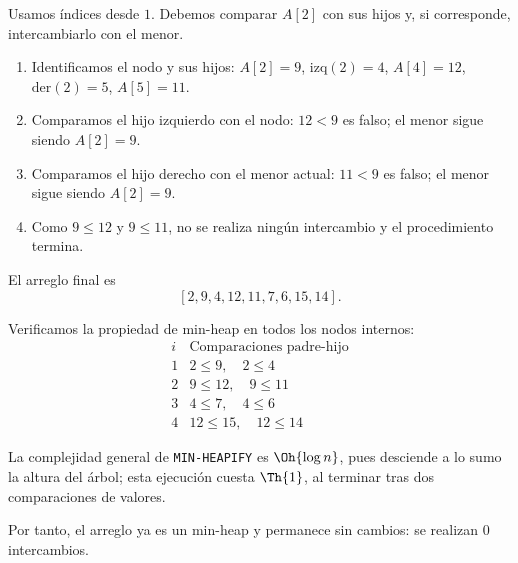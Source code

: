 
Usamos índices desde \(1\). Debemos comparar \(A[2]\) con sus hijos y, si corresponde, intercambiarlo con el menor.

\begin{enumerate}
\item Identificamos el nodo y sus hijos: \(A[2]=9\), \(\mathrm{izq}(2)=4\), \(A[4]=12\), \(\mathrm{der}(2)=5\), \(A[5]=11\).

\item Comparamos el hijo izquierdo con el nodo: \(12<9\) es falso; el menor sigue siendo \(A[2]=9\).

\item Comparamos el hijo derecho con el menor actual: \(11<9\) es falso; el menor sigue siendo \(A[2]=9\).

\item Como \(9\le12\) y \(9\le11\), no se realiza ningún intercambio y el procedimiento termina.
\end{enumerate}

El arreglo final es
\[
[2,9,4,12,11,7,6,15,14].
\]

Verificamos la propiedad de min-heap en todos los nodos internos:
\[
\begin{array}{c|l}
i & \text{Comparaciones padre-hijo}\\ \hline
1 & 2\le9,\quad 2\le4\\
2 & 9\le12,\quad 9\le11\\
3 & 4\le7,\quad 4\le6\\
4 & 12\le15,\quad 12\le14
\end{array}
\]

La complejidad general de \texttt{MIN-HEAPIFY} es \(\Oh{\log n}\), pues desciende a lo sumo la altura del árbol; esta ejecución cuesta \(\Th{1}\), al terminar tras dos comparaciones de valores.

Por tanto, el arreglo ya es un min-heap y permanece sin cambios: se realizan \(0\) intercambios. \fin

